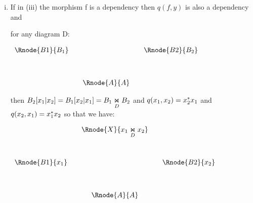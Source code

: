 \documentclass[10pt,a4paper]{scrartcl}
\begin{document}
\begin{enumerate} [(i)]
\item If in (iii) the morphism f is a dependency then  $q(f,y)$ is also a dependency and 

\noindent for any diagram D:
\begin{center}
$
\begin{array}{cp{0cm}cp{0cm}c}
\Rnode{B1}{B_1}& &            &  &\Rnode{B2}{B_2} \\ [1.2cm]
               & &\Rnode{A}{A}& &
\end{array}
$
\end{center}

\noindent then
$B_2[x_1|x_2]=B_1[x_2|x_1] = \fibrex{B_1}{B_2}{D}$ and $q(x_1,x_2)= x_2\sub x_1 $ and $q(x_2,x_1)= x_1 \sub x_2$
\noindent
so that we have:

\begin{center}
$
\begin{array}{cp{0cm}cp{0cm}c}
               && \Rnode{X}{\fibrex{x_1}{x_2}{D}}&&                \\ [1.2cm]
\Rnode{B1}{x_1}&&                                && \Rnode{B2}{x_2} \\ [1.2cm]
               &&\Rnode{A}{A}                    && 
\end{array}
$
\end{center}







\end{enumerate}
\end{document}
